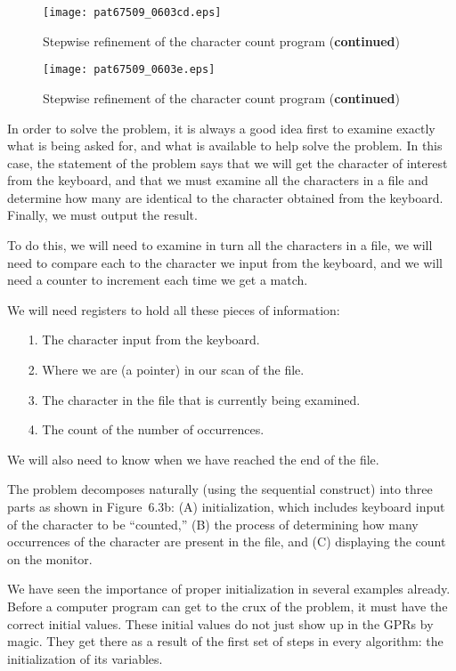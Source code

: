 \documentclass{patt}
\begin{document}
\setcounter{figure}{2}
\begin{figure}
\centerline{\texttt{[image: pat67509\_0603cd.eps]}}
\caption{Stepwise refinement of the character
count program ({\bf continued})}
\label{fig:count1}
\end{figure}

\setcounter{figure}{2}
\begin{figure}
\centerline{\texttt{[image: pat67509\_0603e.eps]}}
\caption{Stepwise refinement of the character
count program ({\bf continued})}
\label{fig:count1}
\end{figure}

In order to solve the problem, it is always a good idea first to
examine exactly what is being asked for, and what is available
to help solve the problem. In this case, the statement of
the problem says that we will get the character of interest from the
keyboard, and that we must examine all the characters in a file and
determine how many are identical to the character obtained from the
keyboard.  Finally, we must output the result.

To do this, we will need to examine in turn all the characters in a file, we 
will need to compare each to the character we input from the keyboard, and 
we will need a counter to increment each time we get a match. 

We will need registers to hold all these pieces of information:

\begin{enumerate}[4.]
\item[1.]
The character input from the keyboard.
\item[2.]
Where we are (a pointer) in our scan of the file.
\item[3.]
The character in the file that is currently being examined.
\item[4.]
The count of the number of occurrences.
\end{enumerate}
We will also need to know when we have reached the end of the file.

The problem decomposes naturally (using the sequential construct) into
three parts as shown in Figure~6.3b: (A) initialization,
which includes keyboard input of the character to be ``counted,''
(B) the process of determining how many occurrences of
the character are present in the file, and (C) displaying the
count on the monitor.

We have seen the importance of proper initialization in several
examples already.  Before a computer program can get to the crux
of the problem, it must have the correct initial values.  These
initial values do not just show up in the GPRs by magic.  They
get there as a result of the first set of steps in every algorithm:
the initialization of its variables.
\end{document}
